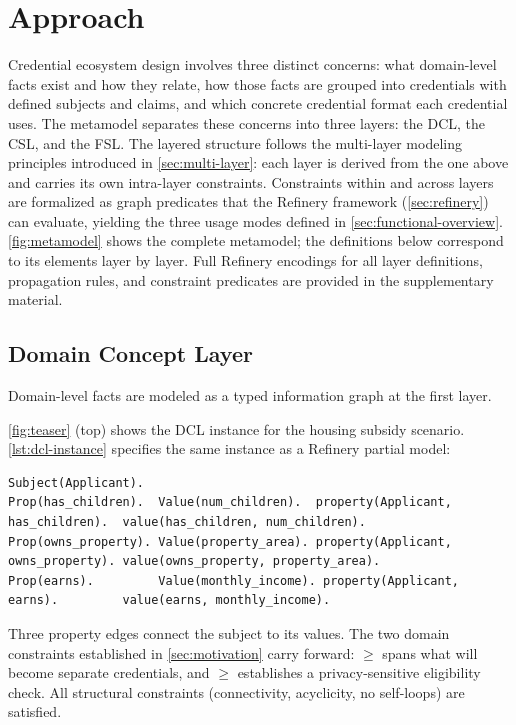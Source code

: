 \section{Approach}\label{sec:approach}

Credential ecosystem design involves three distinct concerns: what domain-level facts exist and how they relate, how those facts are grouped into credentials with defined subjects and claims, and which concrete credential format each credential uses. The metamodel separates these concerns into three layers: the \acf{DCL}, the \acf{CSL}, and the \acf{FSL}. The layered structure follows the multi-layer modeling principles introduced in \autoref{sec:multi-layer}: each layer is derived from the one above and carries its own intra-layer constraints. Constraints within and across layers are formalized as graph predicates that the Refinery framework (\autoref{sec:refinery}) can evaluate, yielding the three usage modes defined in \autoref{sec:functional-overview}. \autoref{fig:metamodel} shows the complete metamodel; the definitions below correspond to its elements layer by layer. Full Refinery encodings for all layer definitions, propagation rules, and constraint predicates are provided in the supplementary material.

\subsection{Domain Concept Layer}\label{sec:dcl}

Domain-level facts are modeled as a typed information graph at the first layer.

\autoref{fig:teaser} (top) shows the \ac{DCL} instance for the housing subsidy scenario. \autoref{lst:dcl-instance} specifies the same instance as a Refinery partial model:

\begin{lstlisting}[style=refinery, caption={DCL partial specification for the housing subsidy scenario}, label=lst:dcl-instance]
Subject(Applicant).
Prop(has_children).  Value(num_children).  property(Applicant, has_children).  value(has_children, num_children).
Prop(owns_property). Value(property_area). property(Applicant, owns_property). value(owns_property, property_area).
Prop(earns).         Value(monthly_income). property(Applicant, earns).         value(earns, monthly_income).
\end{lstlisting}

Three property edges connect the subject to its values. The two domain constraints established in \autoref{sec:motivation} carry forward:  \(\geq\)  spans what will become separate credentials, and  \(\geq\)  establishes a privacy-sensitive eligibility check. All structural constraints (connectivity, acyclicity, no self-loops) are satisfied.

